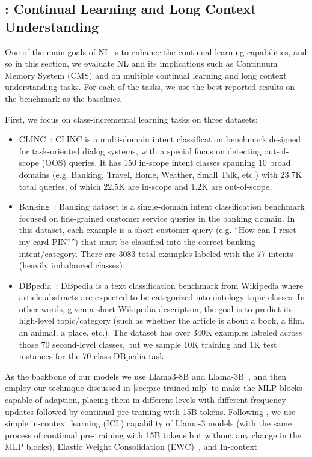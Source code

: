\subsection{\model: Continual Learning and Long Context Understanding}
One of the main goals of NL is to enhance the continual learning capabilities, and so in this section, we evaluate NL and its implications such as Continuum Memory System (CMS) and \model{} on multiple continual learning and long context understanding tasks. For each of the tasks, we use the best reported results on the benchmark as the baselines.






First, we focus on class-incremental learning tasks on three datasets: 
\begin{itemize}
    \item CLINC~\citep{larson2019evaluation}: CLINC is a multi-domain intent classification benchmark designed for task-oriented dialog systems, with a special focus on detecting out-of-scope (OOS) queries. It has 150 in-scope intent classes spanning 10 broad domains (e.g. Banking, Travel, Home, Weather, Small Talk, etc.) with 23.7K total queries, of which 22.5K are in-scope and 1.2K are out-of-scope. 
    \item Banking~\citep{casanueva2020efficient}: Banking dataset is a single-domain intent classification benchmark focused on fine-grained customer service queries in the banking domain. In this dataset, each example is a short customer query (e.g. “How can I reset my card PIN?”) that must be classified into the correct banking intent/category. There are 3083 total examples labeled with the 77 intents (heavily imbalanced classes).
    \item DBpedia~\citep{auer2007dbpedia}: DBpedia is a text classification benchmark from Wikipedia where article abstracts are expected to be categorized into ontology topic classes. In other words, given a short Wikipedia description, the goal is to predict its high-level topic/category (such as whether the article is about a book, a film, an animal, a place, etc.). The dataset has over 340K examples labeled across those 70 second-level classes, but we sample 10K training and 1K test instances for the 70-class DBpedia task.
\end{itemize}
As the backbone of our \model{} models we use Llama3-8B and Llama-3B~\citep{dubey2024llama}, and then employ our technique discussed in \autoref{sec:pre-trained-mlp} to make the MLP blocks capable of adaption, placing them in different levels with different frequency updates followed by continual pre-training with 15B tokens. Following \citet{momeni2025context}, we use simple in-context learning (ICL) capability of Llama-3 models (with the same process of continual pre-training with 15B tokens but without any change in the MLP blocks), Elastic Weight Consolidation (EWC)~\citep{kirkpatrick2017overcoming}, and In-context
